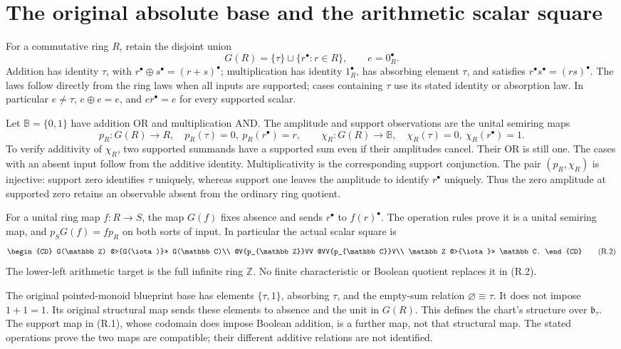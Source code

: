 \section{The original absolute base and the arithmetic scalar square}

For a commutative ring $R$, retain the disjoint union
\[
G(R)=\{\tau\}\sqcup\{r^\bullet:r\in R\},\qquad e=0_R^\bullet.
\]
Addition has identity $\tau$, with
$r^\bullet\oplus s^\bullet=(r+s)^\bullet$; multiplication has identity
$1_R^\bullet$, has absorbing element $\tau$, and satisfies
$r^\bullet s^\bullet=(rs)^\bullet$. The laws follow directly from the
ring laws when all inputs are supported; cases containing $\tau$ use
its stated identity or absorption law. In particular $e\ne\tau$,
$e\oplus e=e$, and $er^\bullet=e$ for every supported scalar.

Let $\mathbb B=\{0,1\}$ have addition OR and multiplication AND. The
amplitude and support observations are the unital semiring maps
\[
p_R:G(R)\longrightarrow R,\quad p_R(\tau)=0,\ p_R(r^\bullet)=r,
\qquad
\chi_R:G(R)\longrightarrow\mathbb B,\quad
\chi_R(\tau)=0,\ \chi_R(r^\bullet)=1.                 \tag{R.1}
\]
To verify additivity of $\chi_R$, two supported summands have a supported
sum even if their amplitudes cancel. Their OR is still one. The cases
with an absent input follow from the additive identity. Multiplicativity
is the corresponding support conjunction. The pair $(p_R,\chi_R)$ is
injective: support zero identifies $\tau$ uniquely, whereas support one
leaves the amplitude to identify $r^\bullet$ uniquely. Thus the zero
amplitude at supported zero retains an observable absent from the ordinary
ring quotient.

For a unital ring map $f:R\to S$, the map $G(f)$ fixes absence and sends
$r^\bullet$ to $f(r)^\bullet$. The operation rules prove it is a
unital semiring map, and $p_SG(f)=fp_R$ on both sorts of input. In
particular the actual scalar square is
\[
\begin{CD}
G(\mathbb Z) @>{G(\iota)}>> G(\mathbb C)\\
@V{p_{\mathbb Z}}VV @VV{p_{\mathbb C}}V\\
\mathbb Z @>{\iota}>> \mathbb C.
\end{CD}                                                   \tag{R.2}
\]
The lower-left arithmetic target is the full infinite ring $\mathbb Z$.
No finite characteristic or Boolean quotient replaces it in (R.2).

The original pointed-monoid blueprint base has elements $\{\tau,1\}$,
absorbing $\tau$, and the empty-sum relation $\varnothing\equiv\tau$.
It does not impose $1+1=1$. Its original structural map sends these
elements to absence and the unit in $G(R)$. This defines the chart's
structure over $\mathfrak b_\tau$. The support map in (R.1), whose
codomain does impose Boolean addition, is a further map, not that
structural map. The stated operations prove the two maps are compatible;
their different additive relations are not identified.

